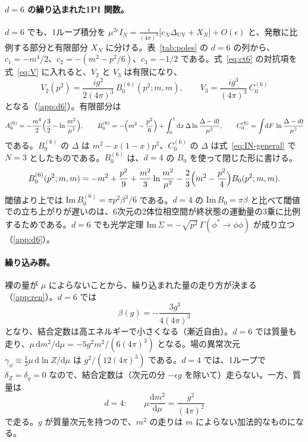 \documentclass[a4paper,10pt]{ltjsarticle}
\newcommand{\dd}{\mathrm{d}}
\begin{document}
\paragraph{$d=6$ の繰り込まれた1PI 関数。}$d=6$ でも、1ループ積分を $\mu^{2\epsilon}I_N=\frac{i}{(4\pi)^3}\bigl[c_N\Delta_{\mathrm{UV}}+X_N\bigr]+O(\epsilon)$ と、発散に比例する部分と有限部分 $X_N$ に分ける。表~\ref{tab:poles} の $d=6$ の列から、$c_1=-m^4/2$、$c_2=-(m^2-p^2/6)$、$c_3=-1/2$ である。式~\eqref{eq:ct6} の対抗項を式~\eqref{eq:V} に入れると、$V_2$ と $V_3$ は有限になり、
\begin{equation}
V_2(p^2)=\frac{ig^2}{2(4\pi)^3}\,B_0^{(6)}(p^2;m,m),\qquad
V_3=\frac{ig^3}{(4\pi)^3}\,C_0^{(6)}
\label{eq:VR6}
\end{equation}
となる（\ref{app:d6}）。有限部分は
\begin{equation}
A_0^{(6)}=-\frac{m^4}{2}\Bigl(\frac32-\ln\frac{m^2}{\mu^2}\Bigr),\qquad
B_0^{(6)}=-\Bigl(m^2-\frac{p^2}{6}\Bigr)+\int_0^1\dd x\,\Delta\ln\frac{\Delta-i0}{\mu^2},\qquad
C_0^{(6)}=\int\!\dd F\,\ln\frac{\Delta-i0}{\mu^2}
\label{eq:X6}
\end{equation}
である。$B_0^{(6)}$ の $\Delta$ は $m^2-x(1-x)p^2$、$C_0^{(6)}$ の $\Delta$ は式~\eqref{eq:IN-general} で $N=3$ としたものである。$B_0^{(6)}$ は、$d=4$ の $B_0$ を使って閉じた形に書ける。
\begin{equation}
B_0^{(6)}(p^2;m,m)=-m^2+\frac{p^2}{9}+\frac{m^2}{3}\ln\frac{m^2}{\mu^2}-\frac23\Bigl(m^2-\frac{p^2}{4}\Bigr)B_0(p^2;m,m) .
\label{eq:B06}
\end{equation}
閾値より上では $\mathrm{Im}\,B_0^{(6)}=\pi p^2\beta^3/6$ である。$d=4$ の $\mathrm{Im}\,B_0=\pi\beta$ と比べて閾値での立ち上がりが遅いのは、6次元の2体位相空間が終状態の運動量の3乗に比例するためである。$d=6$ でも光学定理 $\mathrm{Im}\,\Sigma=-\sqrt{p^2}\,\Gamma(\phi^*\to\phi\phi)$ が成り立つ（\ref{app:d6}）。

\paragraph{繰り込み群。}裸の量が $\mu$ によらないことから、繰り込まれた量の走り方が決まる（\ref{app:ren}）。$d=6$ では
\begin{equation}
\beta(g)=-\frac{3g^3}{4(4\pi)^3}
\label{eq:beta6}
\end{equation}
となり、結合定数は高エネルギーで小さくなる（漸近自由）。$d=6$ では質量も走り、$\mu\,\dd m^2/\dd\mu=-5g^2m^2/(6(4\pi)^3)$ となる。場の異常次元 $\gamma_\phi\equiv\frac12\mu\,\dd\ln Z/\dd\mu$ は $g^2/(12(4\pi)^3)$ である。$d=4$ では、1ループで $\delta_Z=\delta_g=0$ なので、結合定数は（次元の分 $-\epsilon g$ を除いて）走らない。一方、質量は
\begin{equation}
d=4:\qquad \mu\frac{\dd m^2}{\dd\mu}=\frac{g^2}{(4\pi)^2}
\label{eq:mrun4}
\end{equation}
で走る。$g$ が質量次元を持つので、$m^2$ の走りは $m$ によらない加法的なものになる。
\end{document}
